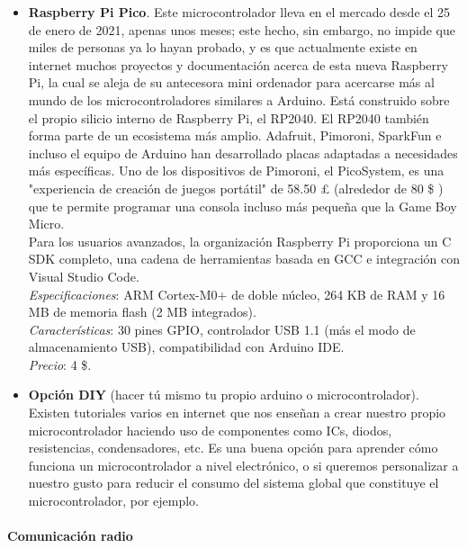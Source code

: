 \documentclass[12pt]{article}
\newcommand{\subsubsubsection}[1]{\paragraph{#1}\mbox{}\\}
\begin{document}
\begin{itemize}
		\item \textbf{Raspberry Pi Pico}. Este microcontrolador lleva en el mercado desde el 25 de enero de 2021, apenas unos meses; este hecho, sin embargo, no impide que miles de personas ya lo hayan probado, y es que actualmente existe en internet muchos proyectos y documentación acerca de esta nueva Raspberry Pi, la cual se aleja de su antecesora mini ordenador para acercarse más al mundo de los microcontroladores similares a Arduino. Está construido sobre el propio silicio interno de Raspberry Pi, el RP2040. El RP2040 también forma parte de un ecosistema más amplio. Adafruit, Pimoroni, SparkFun e incluso el equipo de Arduino han desarrollado placas adaptadas a necesidades más específicas. Uno de los dispositivos de Pimoroni, el PicoSystem, es una "experiencia de creación de juegos portátil" de 58.50 £ (alrededor de 80 \$ ) que te permite programar una consola incluso más pequeña que la Game Boy Micro.\\
		
		Para los usuarios avanzados, la organización Raspberry Pi proporciona un C SDK completo, una cadena de herramientas basada en GCC e integración con Visual Studio Code. \\
		
		\textit{Especificaciones}: ARM Cortex-M0+ de doble núcleo, 264 KB de RAM y 16 MB de memoria flash (2 MB integrados). \\
		
		\textit{Características}: 30 pines GPIO, controlador USB 1.1 (más el modo de almacenamiento USB), compatibilidad con Arduino IDE.\\
		
		\textit{Precio}: 4 \$.\\
		
		\item \textbf{Opción DIY} (hacer tú mismo tu propio arduino o microcontrolador). Existen tutoriales varios en internet que nos enseñan a crear nuestro propio microcontrolador haciendo uso de componentes como ICs, diodos, resistencias, condensadores, etc. Es una buena opción para aprender cómo funciona un microcontrolador a nivel electrónico, o si queremos personalizar a nuestro gusto para reducir el consumo del sistema global que constituye el microcontrolador, por ejemplo.\\

	\end{itemize}
	\subsubsubsection{Comunicación radio}
	
\end{document}
